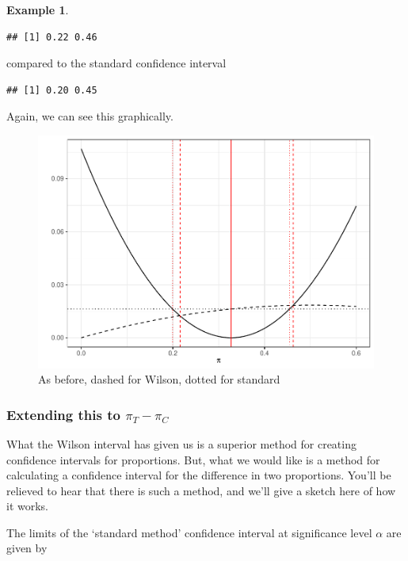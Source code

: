 \documentclass[
  openany]{book}
\theoremstyle{definition}
\theoremstyle{definition}
\newtheorem{example}{Example}[chapter]
\theoremstyle{definition}
\theoremstyle{definition}
\theoremstyle{remark}
\begin{document}
\begin{example}
\begin{verbatim}
## [1] 0.22 0.46
\end{verbatim}

compared to the standard confidence interval

\begin{verbatim}
## [1] 0.20 0.45
\end{verbatim}

Again, we can see this graphically.

\begin{figure}
\centering
\includegraphics{CT4H_notes_files/figure-latex/unnamed-chunk-35-1.pdf}
\caption{\label{fig:unnamed-chunk-35}As before, dashed for Wilson, dotted for standard}
\end{figure}

\end{example}

\subsubsection{\texorpdfstring{Extending this to \(\pi_T - \pi_C\)}{Extending this to \textbackslash pi\_T - \textbackslash pi\_C}}\label{newcombeci}

What the Wilson interval has given us is a superior method for creating confidence intervals for proportions. But, what we would like is a method for calculating a confidence interval for the difference in two proportions. You'll be relieved to hear that there is such a method, and we'll give a sketch here of how it works.

The limits of the `standard method' confidence interval at significance level \(\alpha\) are given by
\end{document}
